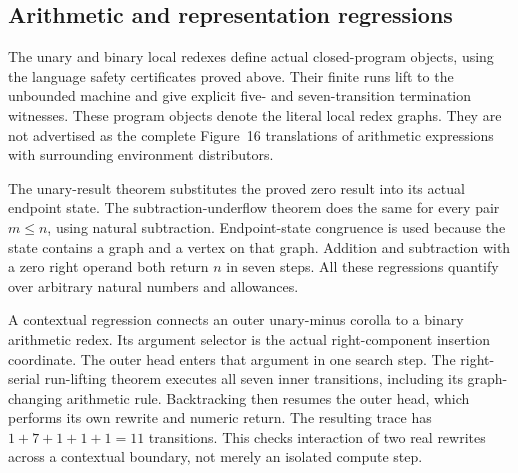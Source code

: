 \subsection{Arithmetic and representation regressions}

The unary and binary local redexes define actual closed-program objects,
using the language safety certificates proved above. Their finite runs lift
to the unbounded machine and give explicit five- and seven-transition
termination witnesses. These program objects denote the literal local
redex graphs. They are not advertised as the complete Figure~16 translations
of arithmetic expressions with surrounding environment distributors.





The unary-result theorem substitutes the proved zero result into its
actual endpoint state. The subtraction-underflow theorem does the same for
every pair $m\leq n$, using natural subtraction. Endpoint-state congruence is
used because the state contains a graph and a vertex on that graph. Addition
and subtraction with a zero right operand both return $n$ in seven steps.
All these regressions quantify over arbitrary natural numbers and allowances.





A contextual regression connects an outer unary-minus corolla to a
binary arithmetic redex. Its argument selector is the actual right-component
insertion coordinate. The outer head enters that argument in one search step.
The right-serial run-lifting theorem executes all seven inner transitions,
including its graph-changing arithmetic rule. Backtracking then resumes the
outer head, which performs its own rewrite and numeric return. The resulting
trace has $1+7+1+1+1=11$ transitions. This checks interaction of two real
rewrites across a contextual boundary, not merely an isolated compute step.

